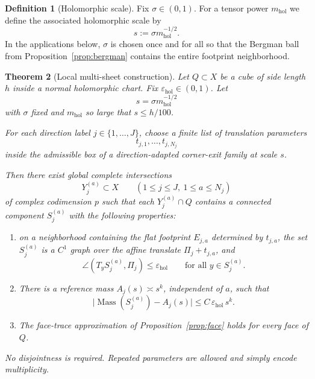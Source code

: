 \documentclass[11pt]{article}
\numberwithin{equation}{section}
\theoremstyle{plain}
\newtheorem{theorem}{Theorem}[section]
\theoremstyle{definition}
\newtheorem{definition}[theorem]{Definition}
\theoremstyle{remark}
\DeclareMathOperator{\Mass}{Mass}
\newcommand{\eps}{\varepsilon}
\newcommand{\mhol}{m_{\mathrm{hol}}}
\begin{document}
\begin{definition}[Holomorphic scale]
Fix $\sigma \in (0,1)$.  For a tensor power $\mhol$ we define the associated holomorphic scale by
\[
s:=\sigma \mhol^{-1/2}.
\]
In the applications below, $\sigma$ is chosen once and for all so that the Bergman ball from Proposition~\ref{prop:bergman} contains the entire footprint neighborhood.
\end{definition}

\begin{theorem}[Local multi-sheet construction]\label{thm:local-sheets}
Let $Q\subset X$ be a cube of side length $h$ inside a normal holomorphic chart.  Fix $\eps_{\mathrm{hol}}\in(0,1)$.  Let
\[
s=\sigma \mhol^{-1/2}
\]
with $\sigma$ fixed and $\mhol$ so large that $s\le h/100$.

For each direction label $j\in\{1,\dots,J\}$, choose a finite list of translation parameters
\[
t_{j,1},\dots,t_{j,N_j}
\]
inside the admissible box of a direction-adapted corner-exit family at scale $s$.

Then there exist global complete intersections
\[
Y_j^{(a)}\subset X
\qquad
(1\le j\le J,\ 1\le a\le N_j)
\]
of complex codimension $p$ such that each $Y_j^{(a)}\cap Q$ contains a connected component $S_j^{(a)}$ with the following properties:
\begin{enumerate}
\item[\textnormal{(i)}] on a neighborhood containing the flat footprint
$E_{j,a}$ determined by $t_{j,a}$, the set $S_j^{(a)}$ is a $C^1$ graph over
the affine translate $\Pi_j+t_{j,a}$, and
\[
\angle(T_yS_j^{(a)},\Pi_j)\le \eps_{\mathrm{hol}}
\qquad
\text{for all }y\in S_j^{(a)}.
\]
\item[\textnormal{(ii)}] There is a reference mass $A_j(s)\asymp s^k$, independent of $a$, such that
\[
\bigl|\Mass(S_j^{(a)})-A_j(s)\bigr|
\le
C\,\eps_{\mathrm{hol}}\,s^k.
\]
\item[\textnormal{(iii)}] The face-trace approximation of
Proposition~\ref{prop:face} holds for every face of $Q$.
\end{enumerate}
No disjointness is required.  Repeated parameters are allowed and simply encode multiplicity.
\end{theorem}
\end{document}
